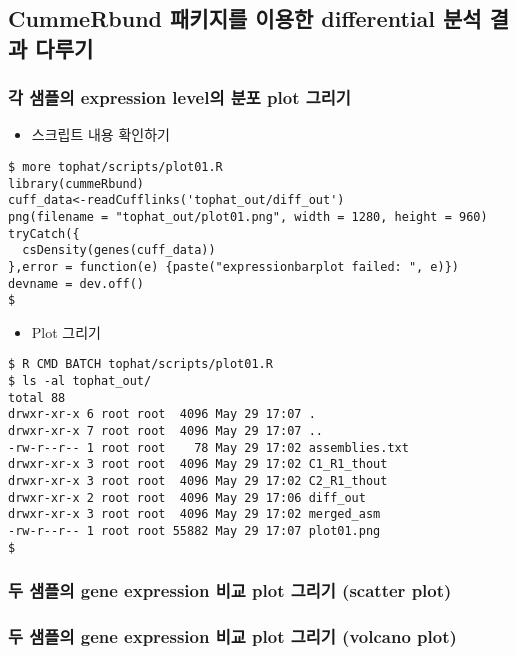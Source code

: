 \documentclass{article}
\begin{document}
\subsection{CummeRbund 패키지를 이용한 differential 분석 결과 다루기}
\subsubsection{각 샘플의 expression level의 분포 plot 그리기}

\begin{itemize}
\item
  \begin{itemize}
  스크립트 내용 확인하기  
  \end{itemize}
\end{itemize}
\begin{lstlisting}[frame=single,style=Bash,xleftmargin=1.4cm,xrightmargin=1.4cm]
$ more tophat/scripts/plot01.R 
library(cummeRbund)
cuff_data<-readCufflinks('tophat_out/diff_out')
png(filename = "tophat_out/plot01.png", width = 1280, height = 960)
tryCatch({
  csDensity(genes(cuff_data))
},error = function(e) {paste("expressionbarplot failed: ", e)})
devname = dev.off()
$
\end{lstlisting}


\begin{itemize}
\item
  \begin{itemize}
  Plot 그리기   
  \end{itemize}
\end{itemize}
\begin{lstlisting}[frame=single,style=Bash,xleftmargin=1.4cm,xrightmargin=1.4cm]
$ R CMD BATCH tophat/scripts/plot01.R 
$ ls -al tophat_out/
total 88
drwxr-xr-x 6 root root  4096 May 29 17:07 .
drwxr-xr-x 7 root root  4096 May 29 17:07 ..
-rw-r--r-- 1 root root    78 May 29 17:02 assemblies.txt
drwxr-xr-x 3 root root  4096 May 29 17:02 C1_R1_thout
drwxr-xr-x 3 root root  4096 May 29 17:02 C2_R1_thout
drwxr-xr-x 2 root root  4096 May 29 17:06 diff_out
drwxr-xr-x 3 root root  4096 May 29 17:02 merged_asm
-rw-r--r-- 1 root root 55882 May 29 17:07 plot01.png
$
\end{lstlisting}


\subsubsection{두 샘플의 gene expression 비교 plot 그리기 (scatter plot)}
\subsubsection{두 샘플의 gene expression 비교 plot 그리기 (volcano plot)}
\end{document}
